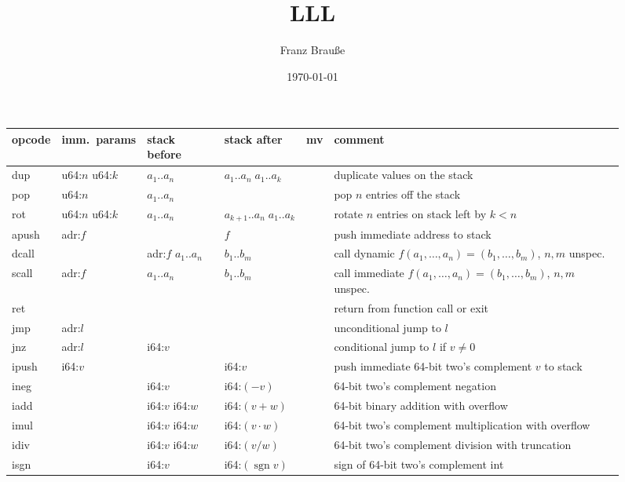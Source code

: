 \documentclass[a4paper,parskip=half]{scrartcl}
\author{Franz Brauße}
\title{LLL}
\date{\today}
\begin{document}
\begin{figure}[h]
\centering
\begin{tabular}{l|l|l|l@{\;\,\vline\,}c@{\,\vline\;\,}l}
  opcode & imm.\ params & stack before & stack after & mv & comment \\ \hline
  \ttfamily dup & u64:$n$ u64:$k$ & $a_1..a_n$ & $a_1..a_n\;a_1..a_k$     && duplicate values on the stack \\
  \ttfamily pop & u64:$n$         & $a_1..a_n$ &                          && pop $n$ entries off the stack \\
  \ttfamily rot & u64:$n$ u64:$k$ & $a_1..a_n$ & $a_{k+1}..a_n\;a_1..a_k$ && rotate $n$ entries on stack left by $k<n$ \\
  \hline
  \ttfamily apush & adr:$f$ &                    & $f$        && push immediate address to stack \\
  \ttfamily dcall &         & adr:$f$ $a_1..a_n$ & $b_1..b_m$ && call dynamic $f(a_1,\ldots,a_n) = (b_1,\ldots,b_m)$, $n,m$ unspec. \\
  \ttfamily scall & adr:$f$ & $a_1..a_n$         & $b_1..b_m$ && call immediate $f(a_1,\ldots,a_n) = (b_1,\ldots,b_m)$, $n,m$ unspec. \\
  \ttfamily ret   &         &                    &            && return from function call or exit \\
  \ttfamily jmp   & adr:$l$ &                    &            && unconditional jump to $l$ \\
  \ttfamily jnz   & adr:$l$ & i64:$v$            &            && conditional jump to $l$ if $v\neq 0$ \\
  \hline
  \ttfamily ipush & i64:$v$ &                 & i64:$v$          && push immediate 64-bit two's complement $v$ to stack \\
  \ttfamily ineg  &         & i64:$v$         & i64:$(-v)$       && 64-bit two's complement negation \\
  \ttfamily iadd  &         & i64:$v$ i64:$w$ & i64:$(v+w)$      && 64-bit binary addition with overflow \\
  \ttfamily imul  &         & i64:$v$ i64:$w$ & i64:$(v\cdot w)$ && 64-bit two's complement multiplication with overflow \\
  \ttfamily idiv  &         & i64:$v$ i64:$w$ & i64:$(v/w)$      && 64-bit two's complement division with truncation \\
  \ttfamily isgn  &         & i64:$v$         & i64:$(\operatorname{sgn}v)$ && sign of 64-bit two's complement int \\

\end{tabular}
\end{figure}
\end{document}
